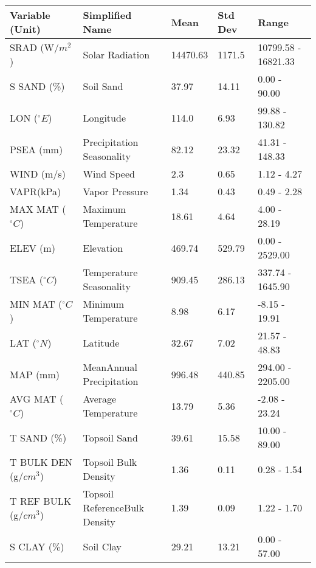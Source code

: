 \documentclass[AutoFakeBold]{LZUThesis-PgD&PhD}
\begin{document}
\begin{table}[H]
		\label{tab:range}
		\begin{tabular}{lllll}
			\toprule
			Variable (Unit) & Simplified Name & Mean & Std Dev & Range \\
			\midrule
			SRAD (W/$m^2$) & Solar Radiation & 14470.63 & 1171.5 & 10799.58 - 16821.33 \\
			S SAND (\%) & Soil Sand & 37.97 & 14.11 & 0.00 - 90.00 \\
			LON ($ ^\circ E$)& Longitude & 114.0 & 6.93 & 99.88 - 130.82 \\
			PSEA (mm)& Precipitation Seasonality & 82.12 & 23.32 & 41.31 - 148.33 \\
			WIND (m/s)& Wind Speed & 2.3 & 0.65 & 1.12 - 4.27 \\
			VAPR(kPa) & Vapor Pressure & 1.34 & 0.43 & 0.49 - 2.28 \\
			MAX MAT ($ ^\circ C$) & Maximum Temperature & 18.61 & 4.64 & 4.00 - 28.19 \\
			ELEV (m) & Elevation & 469.74 & 529.79 & 0.00 - 2529.00 \\
			TSEA ($ ^\circ C$) & Temperature Seasonality & 909.45 & 286.13 & 337.74 - 1645.90 \\
			MIN MAT ($ ^\circ C$) & Minimum Temperature & 8.98 & 6.17 & -8.15 - 19.91 \\
			LAT ($ ^\circ N$)& Latitude & 32.67 & 7.02 & 21.57 - 48.83 \\
			MAP (mm) & MeanAnnual Precipitation & 996.48 & 440.85 & 294.00 - 2205.00 \\
			AVG MAT ($ ^\circ C$)  & Average Temperature & 13.79 & 5.36 & -2.08 - 23.24 \\
			T SAND (\%) & Topsoil Sand & 39.61 & 15.58 & 10.00 - 89.00 \\
			T BULK DEN (g/$cm^3$)& Topsoil Bulk Density & 1.36 & 0.11 & 0.28 - 1.54 \\
			T REF BULK (g/$cm^3$)& Topsoil ReferenceBulk Density & 1.39 & 0.09 & 1.22 - 1.70 \\
			S CLAY (\%) & Soil Clay & 29.21 & 13.21 & 0.00 - 57.00 \\
			\bottomrule
		\end{tabular}
	\end{table}
	
\end{document}
